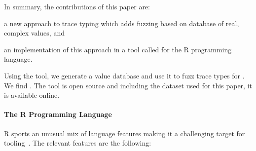 \documentclass[sigplan,anonymous,review]{acmart}
\begin{document}
In summary, the contributions of this paper are:
%
\begin{inparaenum}[(1)]
    \item a new approach to trace typing which adds fuzzing based on database of real, complex values, and
    \item an implementation of this approach in a tool called \tool for the R programming language.
\end{inparaenum} 
Using the tool, we generate a value database  and use it to fuzz trace types for .
We find .
%
The tool is open source and including the dataset used for this paper, it is available online.

\paragraph{The R Programming Language}

R sports an unusual mix of language features making it a challenging target for
tooling~\cite{morandat2012evaluating}. The relevant features are the following:

\end{document}
